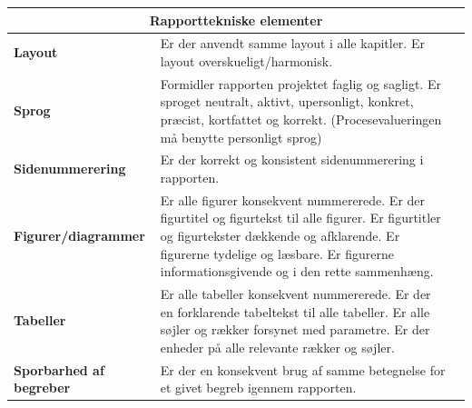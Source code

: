 \begin{longtable}{|p{30mm}|p{90mm}|p{25mm}|}
\hline
\multicolumn{3}{c}{\textbf{Rapporttekniske elementer}} \\ \hline

\textbf{Layout} & Er der anvendt samme layout i alle kapitler. 
Er layout overskueligt/harmonisk.
                                        &           \\ \hline

\textbf{Sprog} & Formidler rapporten projektet faglig og sagligt.
Er sproget  neutralt, aktivt, upersonligt, konkret, præcist, kortfattet og korrekt.
(Procesevalueringen må benytte personligt sprog)
                                        &           \\ \hline

\textbf{Sidenummerering} & Er der korrekt og konsistent sidenummerering i rapporten. 
                                        &           \\ \hline

\textbf{Figurer/diagrammer} & Er alle figurer konsekvent nummererede.
Er der figurtitel og figurtekst til alle figurer.
Er figurtitler og figurtekster dækkende og afklarende.
Er figurerne tydelige og læsbare.
Er figurerne informationsgivende og i den rette sammenhæng.
                                        &           \\ \hline

\textbf{Tabeller} & Er alle tabeller konsekvent nummererede.
Er der en forklarende tabeltekst til alle tabeller.
Er alle søjler og rækker forsynet med parametre.
Er der enheder på alle relevante rækker og søjler.
                                        &           \\ \hline

\textbf{Sporbarhed af begreber} & Er der en konsekvent brug af samme betegnelse for et givet begreb igennem rapporten. 
                                        &           \\ \hline



\end{longtable}

